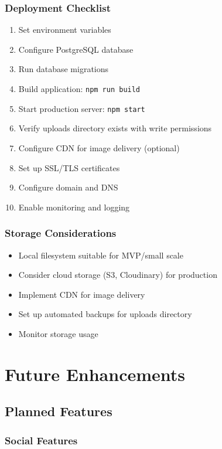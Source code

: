\documentclass[12pt,a4paper]{report}
\begin{document}
\subsection{Deployment Checklist}

\begin{enumerate}
    \item Set environment variables
    \item Configure PostgreSQL database
    \item Run database migrations
    \item Build application: \texttt{npm run build}
    \item Start production server: \texttt{npm start}
    \item Verify uploads directory exists with write permissions
    \item Configure CDN for image delivery (optional)
    \item Set up SSL/TLS certificates
    \item Configure domain and DNS
    \item Enable monitoring and logging
\end{enumerate}

\subsection{Storage Considerations}

\begin{itemize}
    \item Local filesystem suitable for MVP/small scale
    \item Consider cloud storage (S3, Cloudinary) for production
    \item Implement CDN for image delivery
    \item Set up automated backups for uploads directory
    \item Monitor storage usage
\end{itemize}

\chapter{Future Enhancements}

\section{Planned Features}

\subsection{Social Features}
\end{document}
